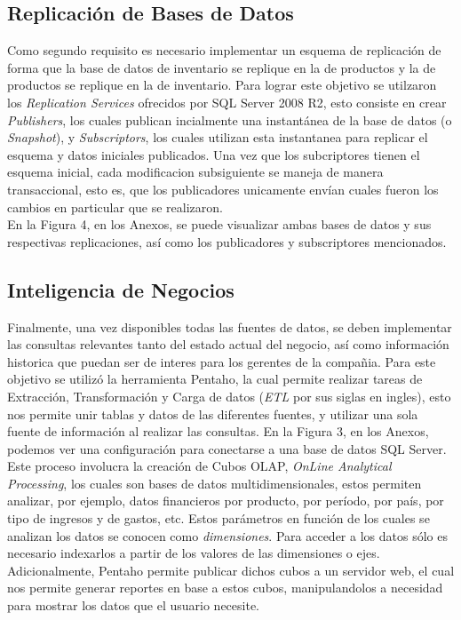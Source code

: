 \documentclass{article}
\begin{document}
\subsection {Replicaci\'on de Bases de Datos}

Como segundo requisito es necesario implementar un esquema de replicaci\'on de forma que la base de datos de inventario se replique en la de productos y la de productos se replique en la
de inventario. Para lograr este objetivo se utilzaron los \emph{Replication Services} ofrecidos por SQL Server 2008 R2, esto consiste en crear \emph{Publishers}, los cuales publican incialmente una instant\'anea de la base de datos (o \emph{Snapshot}), y \emph{Subscriptors}, los cuales utilizan esta instantanea para replicar el esquema y datos iniciales publicados. Una vez que los subcriptores tienen el esquema inicial, cada modificacion subsiguiente se maneja de manera transaccional, esto es, que los publicadores unicamente env\'ian cuales fueron los cambios en particular que se realizaron.\\
En la Figura 4, en los Anexos, se puede visualizar ambas bases de datos y sus respectivas replicaciones, as\'i como los publicadores y subscriptores mencionados.

\subsection {Inteligencia de Negocios}

Finalmente, una vez disponibles todas las fuentes de datos, se deben implementar las consultas relevantes tanto del estado actual del negocio, as\'i como informaci\'on historica que puedan ser de interes para los gerentes de la compa\~nia. Para este objetivo se utiliz\'o la herramienta Pentaho, la cual permite realizar tareas de Extracci\'on, Transformaci\'on y Carga de datos (\emph{ETL} por sus siglas en ingles), esto nos permite unir tablas y datos de las diferentes fuentes, y utilizar una sola fuente de informaci\'on al realizar las consultas. En la Figura 3, en los Anexos, podemos ver una configuraci\'on para conectarse a una base de datos SQL Server. \\

Este proceso involucra la creaci\'on de Cubos OLAP, \emph{OnLine Analytical Processing}, los cuales son bases de datos multidimensionales, estos permiten analizar, por ejemplo, datos financieros por producto, por período, por pa\'is, por tipo de ingresos y de gastos, etc. Estos parámetros en funci\'on de los cuales se analizan los datos se conocen como \emph{dimensiones}. Para acceder a los datos sólo es necesario indexarlos a partir de los valores de las dimensiones o ejes.\\
Adicionalmente, Pentaho permite publicar dichos cubos a un servidor web, el cual nos permite generar reportes en base a estos cubos, manipulandolos a necesidad para mostrar los datos que el usuario necesite. 
\end{document}
